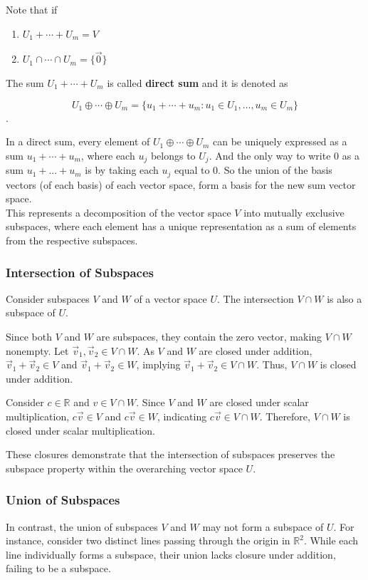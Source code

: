Note that if 

\begin{enumerate}
    \item $U_1 + \cdots + U_m = V$
    \item $U_1 \cap \cdots \cap U_m = \{\vec 0\}$
\end{enumerate}

The sum $U_1 + \cdots + U_m$ is called \textbf{direct sum} and it is denoted as

\[ U_1 \oplus \cdots \oplus U_m = \{ u_1 + \cdots + u_m : u_1 \in U_1, \ldots, u_m \in U_m\} \].

In a direct sum, every element of $U_1 \oplus \cdots \oplus U_m$ can be uniquely expressed as a sum $u_1 + \cdots + u_m$, where each $u_j$ belongs to $U_j$. And the only way to write 0 as a sum $u_1+...+u_m$ is by taking each $u_j$ equal to 0. So the union of the basis vectors (of each basis) of each vector space, form a basis for the new sum vector space.
\\

This represents a decomposition of the vector space $V$ into mutually exclusive subspaces, where each element has a unique representation as a sum of elements from the respective subspaces.
\\

\subsubsection{Intersection of Subspaces}

Consider subspaces $V$ and $W$ of a vector space $U$. The intersection $V \cap W$ is also a subspace of $U$.

Since both $V$ and $W$ are subspaces, they contain the zero vector, making $V \cap W$ nonempty. Let $\vec v_1, \vec v_2 \in V \cap W$. As $V$ and $W$ are closed under addition, $\vec v_1 + \vec v_2 \in V$ and $\vec v_1 + \vec v_2 \in W$, implying $\vec v_1 + \vec v_2 \in V \cap W$. Thus, $V \cap W$ is closed under addition.

Consider $c \in \mathbb{R}$ and $v \in V \cap W$. Since $V$ and $W$ are closed under scalar multiplication, $c \vec v \in V$ and $c \vec v \in W$, indicating $c \vec v \in V \cap W$. Therefore, $V \cap W$ is closed under scalar multiplication.

These closures demonstrate that the intersection of subspaces preserves the subspace property within the overarching vector space $U$.

\subsubsection{Union of Subspaces}

In contrast, the union of subspaces $V$ and $W$ may not form a subspace of $U$. For instance, consider two distinct lines passing through the origin in $\mathbb{R}^2$. While each line individually forms a subspace, their union lacks closure under addition, failing to be a subspace.